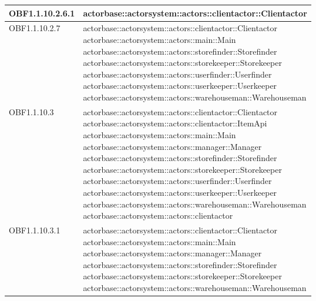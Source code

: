 \documentclass{scalatekids-article}
\begin{document}
\begin{longtable}[H]{|p{4.5cm}|p{13cm}|}
  \hline
  OBF1.1.10.2.6.1 & \multiLineCell[t]{actorbase::actorsystem::actors::clientactor::Clientactor\\}\\
  \hline
  OBF1.1.10.2.7 & \multiLineCell[t]{actorbase::actorsystem::actors::clientactor::Clientactor\\actorbase::actorsystem::actors::main::Main\\actorbase::actorsystem::actors::storefinder::Storefinder\\actorbase::actorsystem::actors::storekeeper::Storekeeper\\actorbase::actorsystem::actors::userfinder::Userfinder\\actorbase::actorsystem::actors::userkeeper::Userkeeper\\actorbase::actorsystem::actors::warehouseman::Warehouseman\\}\\
  \hline
  OBF1.1.10.3 & \multiLineCell[t]{actorbase::actorsystem::actors::clientactor::Clientactor\\actorbase::actorsystem::actors::clientactor::ItemApi\\actorbase::actorsystem::actors::main::Main\\actorbase::actorsystem::actors::manager::Manager\\actorbase::actorsystem::actors::storefinder::Storefinder\\actorbase::actorsystem::actors::storekeeper::Storekeeper\\actorbase::actorsystem::actors::userfinder::Userfinder\\actorbase::actorsystem::actors::userkeeper::Userkeeper\\actorbase::actorsystem::actors::warehouseman::Warehouseman\\actorbase::actorsystem::actors::clientactor\\}\\
  \hline
  OBF1.1.10.3.1 & \multiLineCell[t]{actorbase::actorsystem::actors::clientactor::Clientactor\\actorbase::actorsystem::actors::main::Main\\actorbase::actorsystem::actors::manager::Manager\\actorbase::actorsystem::actors::storefinder::Storefinder\\actorbase::actorsystem::actors::storekeeper::Storekeeper\\actorbase::actorsystem::actors::warehouseman::Warehouseman\\}\\

\end{longtable}
\end{document}
